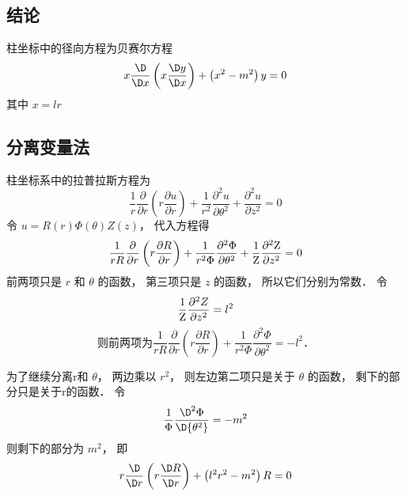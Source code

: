 

\subsection{结论}

柱坐标中的径向方程为贝赛尔方程
 \begin{equation}
x\frac{\D}{{\D x}}\left( {x\frac{{\D y}}{{\D x}}} \right) + \left( {{x^2} - {m^2}} \right)y = 0
\end{equation}
其中 $x = lr$ 

\subsection{分离变量法}
柱坐标系中的拉普拉斯方程为
\begin{equation}
\frac{1}{r}\frac{\partial }{{\partial r}}\left( {r\frac{{\partial u}}{{\partial r}}} \right) + \frac{1}{{{r^2}}}\frac{{{\partial ^2}u}}{{\partial {\theta ^2}}} + \frac{{{\partial ^2}u}}{{\partial {z^2}}} = 0
\end{equation}
令 $u = R\left( r \right)\Phi \left( \theta  \right)Z\left( z \right)$，   代入方程得
\begin{equation}
\frac{1}{{rR}}\frac{\partial }{{\partial r}}\left( {r\frac{{\partial R}}{{\partial r}}} \right) + \frac{1}{{{r^2}\Phi }}\frac{{{\partial ^2}\Phi }}{{\partial {\theta ^2}}} + \frac{1}{{\rm Z}}\frac{{{\partial ^2}{\rm Z}}}{{\partial {z^2}}} = 0
\end{equation}
前两项只是 $r$ 和 $\theta $ 的函数， 第三项只是 $z$ 的函数， 所以它们分别为常数． 令
\begin{equation}\label{CylLap_4}
\frac{1}{{\rm Z}}\frac{{{\partial ^2}Z}}{{\partial {z^2}}} = {l^2}
\end{equation}
\begin{equation}
\text{ 则前两项为} \frac{1}{{rR}}\frac{\partial }{{\partial r}}\left( {r\frac{{\partial R}}{{\partial r}}} \right) + \frac{1}{{{r^2}\Phi }}\frac{{{\partial ^2}\Phi }}{{\partial {\theta ^2}}} =  - {l^2} \text{． } 
\end{equation}

为了继续分离r和 $\theta $，   两边乘以 ${r^2}$，   则左边第二项只是关于 $\theta $  的函数， 剩下的部分只是关于r的函数． 令
\begin{equation}\label{CylLap_6}
\frac{1}{\Phi }\frac{{{\D ^2}\Phi }}{{\D {\theta ^2}}} =  - {m^2}
\end{equation}
则剩下的部分为 ${m^2}$，   即
  \begin{equation}\label{CylLap_7}
r\frac{\D }{{\D r}}\left( {r\frac{{\D R}}{{\D r}}} \right) + \left( {{l^2}{r^2} - {m^2}} \right)R = 0
\end{equation}

